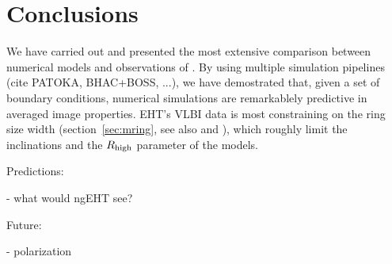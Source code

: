 \section{Conclusions}\label{sec:conclusions}


We have carried out and presented the most extensive comparison
between numerical models and observations of \sgra.
By using multiple simulation pipelines (cite PATOKA, BHAC+BOSS, ...),
we have demostrated that, given a set of boundary conditions,
numerical simulations are remarkablely predictive in averaged image
properties.
EHT's VLBI data is most constraining on the ring size width
(section~\ref{sec:mring}, see also \citealt{EHTpaperIII} and
\citealt{EHTpaperIV}), which roughly limit the inclinations and the
$R_\mathrm{high}$ parameter of the models.

Predictions:

- what would ngEHT see?

Future:

- polarization
